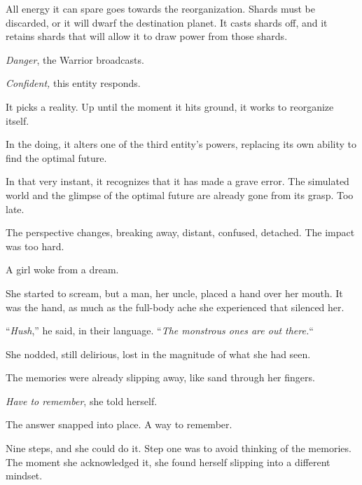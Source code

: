 All energy it can spare goes towards the reorganization.  Shards must be discarded, or it will dwarf the destination planet.  It casts shards off, and it retains shards that will allow it to draw power from those shards.



\emph{Danger}, the Warrior broadcasts.



\emph{Confident, }this entity responds.



It picks a reality.  Up until the moment it hits ground, it works to reorganize itself.



In the doing, it alters one of the third entity's powers, replacing its own ability to find the optimal future.



In that very instant, it recognizes that it has made a grave error.  The simulated world and the glimpse of the optimal future are already gone from its grasp.  Too late.



The perspective changes, breaking away, distant, confused, detached.  The impact was too hard.



\sectionbreak



A girl woke from a dream.



She started to scream, but a man, her uncle, placed a hand over her mouth.  It was the hand, as much as the full-body ache she experienced that silenced her.



``\emph{Hush},'' he said, in their language.  ``\emph{The monstrous ones are out there.}``



She nodded, still delirious, lost in the magnitude of what she had seen.



The memories were already slipping away, like sand through her fingers.



\emph{Have to remember}, she told herself.



The answer snapped into place.  A way to remember.



Nine steps, and she could do it.  Step one was to avoid thinking of the memories.  The moment she acknowledged it, she found herself slipping into a different mindset.



